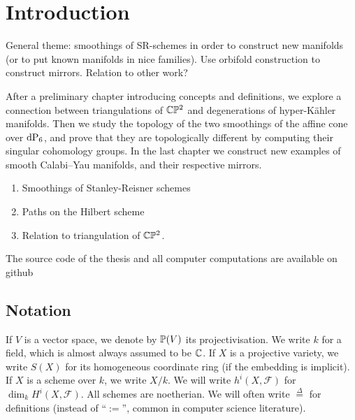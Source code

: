 \chapter{Introduction}
\label{sec:intro}



General theme: smoothings of SR-schemes in order to construct new manifolds (or to put known manifolds in nice families). Use orbifold construction to construct mirrors. Relation to other work?
    
After a preliminary chapter introducing concepts and definitions, we explore a connection between triangulations of $\C \P^2$ and degenerations of hyper-Kähler manifolds. Then we study the topology of the two smoothings of the affine cone over $\dP6$, and prove that they are topologically different by computing their singular cohomology groups. In the last chapter we construct new examples of smooth Calabi--Yau manifolds, and their respective mirrors.

\begin{enumerate}
    \item Smoothings of Stanley-Reisner schemes
    \item Paths on the Hilbert scheme
    \item Relation to triangulation of $\C \P^2$.
\end{enumerate}

The source code of the thesis and all computer computations are available on github



\section{Notation}

If $V$ is a vector space, we denote by $\P(V)$ its projectivisation. We write $k$ for a field, which is almost always assumed to be $\C$. If $X$ is a projective variety, we write $S(X)$ for its homogeneous coordinate ring (if the embedding is implicit). If $X$ is a scheme over $k$, we write $X/k$. We will write $h^i(X,\mathscr F)$ for $\dim_k H^i(X,\mathscr F)$. All schemes are noetherian. We will often write $\stackrel \Delta = $ for definitions (instead of  ``$:=$'', common in computer science literature).